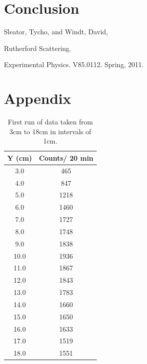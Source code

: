 \section{Conclusion}


\begin{thebibliography}{99}
Sleator, Tycho, and Windt, David, \begin{em}Rutherford Scattering. \end{em}Experimental Physics. V85.0112. Spring, 2011.
\end{thebibliography}

\section{Appendix}
\begin{table}[H]
\begin{tabular}{|c|c|}\hline
Y (cm) & Counts/ 20 min\\ \hline
3.0 & 465  \\ \hline
4.0 &  847 \\ \hline
5.0 &  1218 \\ \hline
6.0 &  1460 \\ \hline
7.0 &  1727\\ \hline
8.0 &  1748 \\ \hline
9.0 &  1838\\ \hline
10.0 &  1936\\ \hline
11.0 &  1867\\ \hline
12.0 &  1843\\ \hline
13.0 &  1783\\ \hline
14.0 &  1660\\ \hline
15.0 &  1650\\ \hline
16.0 & 1633 \\ \hline
17.0 &  1519\\ \hline
18.0 &  1551\\ \hline
\end {tabular}
\caption{First run of data taken from 3cm to 18cm in intervals of 1cm.}
\end{table}

